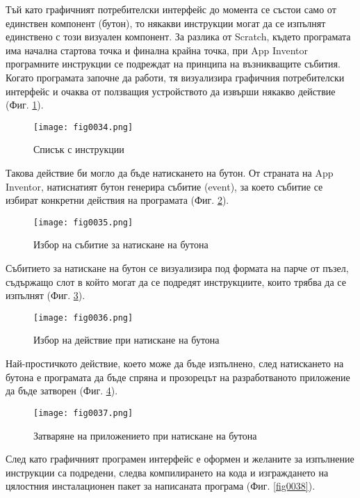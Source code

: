 Тъй като графичният потребителски интерфейс до момента се състои само от единствен компонент (бутон), то някакви инструкции могат да се изпълнят единствено с този визуален компонент. За разлика от Scratch, където програмата има начална стартова точка и финална крайна точка, при App Inventor програмните инструкции се подреждат на принципа на възникващите събития. Когато програмата започне да работи, тя визуализира графичния потребителски интерфейс и очаква от ползващия устройството да извърши някакво действие (Фиг. \ref{fig0034}). 

\begin{figure}[H]
  \centering
  \texttt{[image: fig0034.png]}
  \caption{Списък с инструкции}
\label{fig0034}
\end{figure}

Такова действие би могло да бъде натискането на бутон. От страната на App Inventor, натиснатият бутон генерира събитие (event), за което събитие се избират конкретни действия на програмата (Фиг. \ref{fig0035}). 

\begin{figure}[H]
  \centering
  \texttt{[image: fig0035.png]}
  \caption{Избор на събитие за натискане на бутона}
\label{fig0035}
\end{figure}

Събитието за натискане на бутон се визуализира под формата на парче от пъзел, съдържащо слот в който могат да се подредят инструкциите, които трябва да се изпълнят (Фиг. \ref{fig0036}).

\begin{figure}[H]
  \centering
  \texttt{[image: fig0036.png]}
  \caption{Избор на действие при натискане на бутона}
\label{fig0036}
\end{figure}

Най-простичкото действие, което може да бъде изпълнено, след натискането на бутона е програмата да бъде спряна и прозорецът на разработваното приложение да бъде затворен (Фиг. \ref{fig0037}).

\begin{figure}[H]
  \centering
  \texttt{[image: fig0037.png]}
  \caption{Затваряне на приложението при натискане на бутона}
\label{fig0037}
\end{figure}

След като графичният програмен интерфейс е оформен и желаните за изпълнение инструкции са подредени, следва компилирането на кода и изграждането на цялостния инсталационен пакет за написаната програма (Фиг. \ref{fig0038}). 

